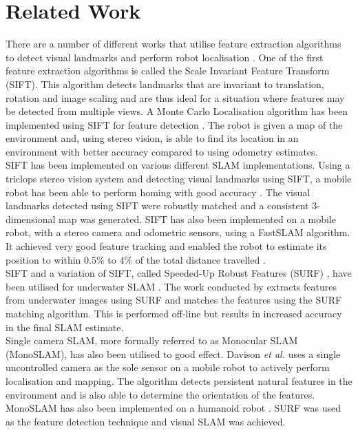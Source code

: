 
\section{Related Work}
\label{sec:relatedWork}
There are a number of different works that utilise feature extraction algorithms to detect visual landmarks and perform robot localisation \citep{irp}. One of the first feature extraction algorithms is called the Scale Invariant Feature Transform (SIFT)\citep{Lowe2004}. This algorithm detects landmarks that are invariant to translation, rotation and image scaling and are thus ideal for a situation where features may be detected from multiple views. A Monte Carlo Localisation algorithm has been implemented using SIFT for feature detection \citep{Gil}. The robot is given a map of the environment and, using stereo vision, is able to find its location in an environment with better accuracy compared to using odometry estimates.\\


SIFT has been implemented on various different SLAM implementations. Using a triclops stereo vision system and detecting visual landmarks using SIFT, a mobile robot has been able to perform homing with good accuracy \citep{Se2001, Se2002}. The visual landmarks detected using SIFT were robustly matched and a consistent 3-dimensional map was generated. SIFT has also been implemented on a mobile robot, with a stereo camera and odometric sensors, using a FastSLAM algorithm. It achieved very good feature tracking and enabled the robot to estimate its position to within $0.5\%$ to $4\%$ of the total distance travelled \citep{Barfoot2005}.\\

SIFT and a variation of SIFT, called Speeded-Up Robust Features (SURF) \citep{Bay2008}, have been utilised for underwater SLAM \citep{Aulinas2011, Thomas}. The work conducted by \citet{Aulinas2011} extracts features from underwater images using SURF and matches the features using the SURF matching algorithm. This is performed off-line but results in increased accuracy in the final SLAM estimate.\\

Single camera SLAM, more formally referred to as Monocular SLAM (MonoSLAM), has also been utilised to good effect. Davison \textit{et al.} \citep{Davison2007} uses a single uncontrolled camera as the sole sensor on a mobile robot to actively perform localisation and mapping. The algorithm detects persistent natural features in the environment and is also able to determine the orientation of the features. MonoSLAM has also been implemented on a humanoid robot \citep{Wang2011}. SURF was used as the feature detection technique and visual SLAM was achieved.\\

